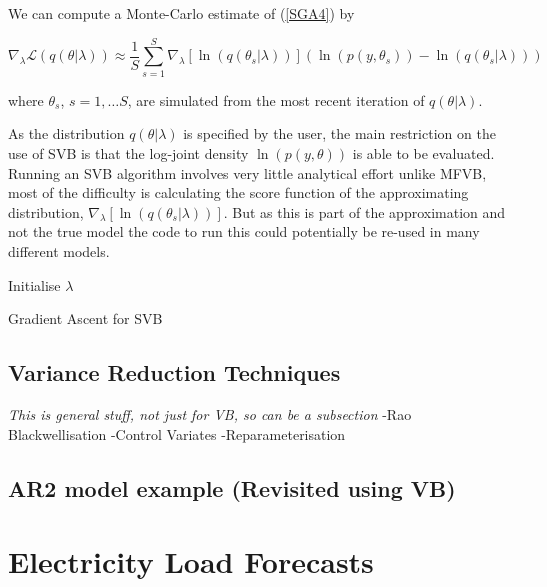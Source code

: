 \documentclass{article}\usepackage[]{graphicx}\usepackage[]{color}
\numberwithin{equation}{section}
\begin{document}
We can compute a Monte-Carlo estimate of (\ref{SGA4}) by 

\begin{equation}
\label{SGA5}
\nabla_{\lambda}\mathcal{L}(q(\theta | \lambda)) \approx \frac{1}{S}\sum_{s=1}^{S} \nabla_{\lambda} [\ln(q(\theta_s | \lambda))] (\ln (p(y, \theta_s)) - \ln(q(\theta_s | \lambda)))
\end{equation}

where $\theta_s$, $s = 1, \dots S$, are simulated from the most recent iteration of  $q(\theta | \lambda)$.

As the distribution $q(\theta | \lambda)$ is specified by the user, the main restriction on the use of SVB is that the log-joint density $\ln(p(y, \theta))$ is able to be evaluated. Running an SVB algorithm involves very little analytical effort unlike MFVB, most of the difficulty is calculating the score function of the approximating distribution,
$\nabla_{\lambda} [\ln(q(\theta_s | \lambda))]$. But as this is part of the approximation and not the true model the code to run this could potentially be re-used in many different models. 

\begin{algorithm}[H]
 Initialise $\lambda$\;
 \caption{Gradient Ascent for SVB}
  \label{alg:algorithm2}
\end{algorithm}

\subsection{Variance Reduction Techniques} \emph{This is general stuff, not just for VB, so can be a subsection}
-Rao Blackwellisation
-Control Variates
-Reparameterisation
\subsection{AR2 model example (Revisited using VB)}


\section{Electricity Load Forecasts}
\end{document}
